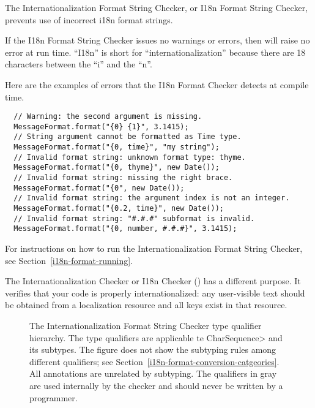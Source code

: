 \htmlhr
{}

The Internationalization Format String Checker, or I18n Format String Checker,
prevents use of incorrect i18n format strings.

If the I18n Format String Checker issues no warnings or errors, then
will raise no error at run time.
``I18n'' is short for
``internationalization'' because there are 18 characters between the ``i'' and
the ``n''.

Here are the examples of errors that the
I18n Format Checker
detects at compile time.

\begin{Verbatim}
  // Warning: the second argument is missing.
  MessageFormat.format("{0} {1}", 3.1415);
  // String argument cannot be formatted as Time type.
  MessageFormat.format("{0, time}", "my string");
  // Invalid format string: unknown format type: thyme.
  MessageFormat.format("{0, thyme}", new Date());
  // Invalid format string: missing the right brace.
  MessageFormat.format("{0", new Date());
  // Invalid format string: the argument index is not an integer.
  MessageFormat.format("{0.2, time}", new Date());
  // Invalid format string: "#.#.#" subformat is invalid.
  MessageFormat.format("{0, number, #.#.#}", 3.1415);
\end{Verbatim}

For instructions on how to run the Internationalization Format String
Checker, see Section~\ref{i18n-format-running}.

The Internationalization Checker or I18n Checker ()
has a different purpose.  It verifies that your code is properly
internationalized: any user-visible text should be obtained from a
localization resource and all keys exist in that resource.




\begin{figure}
\caption{The
  Internationalization
  Format String Checker type qualifier hierarchy.
  The type qualifiers are applicable te \<CharSequence> and its subtypes.
  The figure does not show the subtyping rules among different
  qualifiers; see
  Section~\ref{i18n-format-conversion-catgeories}.
  All  annotations are unrelated by subtyping.
  The qualifiers in gray are used internally by
  the checker and should never be written by a programmer.
}
\label{i18n-format-type-hierarchy}
\end{figure}

